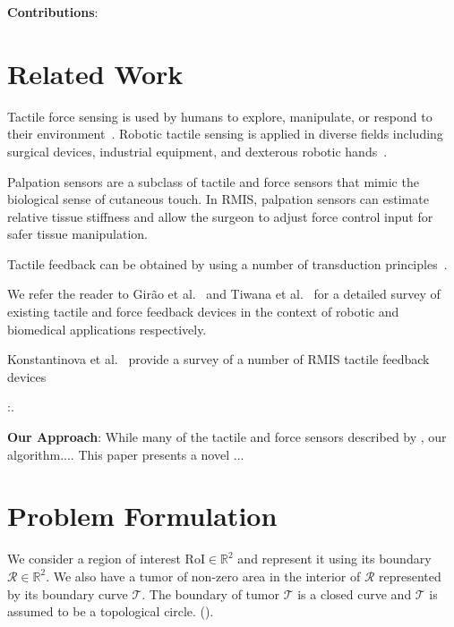 \documentclass[letterpaper, 10 pt, conference]{ieeeconf}
\begin{document}
\cite{nichols2015methods}

\textbf{Contributions}:



\section{Related Work}
\label{sec:relWork}
Tactile force sensing is used by humans to explore, manipulate, or respond to their environment~\cite{cutkosky2008force}.
Robotic tactile sensing is applied in diverse fields including surgical devices, industrial equipment, and dexterous robotic hands~\cite{cutkosky2008force}.

Palpation sensors are a subclass of tactile and force sensors that mimic the biological sense of cutaneous touch. In RMIS, palpation sensors can estimate relative tissue stiffness and allow the surgeon to adjust force control input for safer tissue manipulation.

Tactile feedback can be obtained by using a number of transduction principles~\cite{konstantinova2014implementation, puangmali2008state}. We refer the reader to Gir{\~a}o et al.~\cite{girao2013tactile} and Tiwana et al.~\cite{tiwana2012review} for a detailed survey of existing tactile and force feedback devices in the context of robotic and biomedical applications respectively. 

Konstantinova et al.~\cite{konstantinova2014implementation} provide a survey of a number of RMIS tactile feedback devices 

:\cite{goldman2013algorithms}.


\textbf{Our Approach}: While many of the tactile and force sensors described by \citep{goldman2013algorithms}, our algorithm....
This paper presents a novel ...


\section{Problem Formulation}
\label{sec:problem}
We consider a region of interest $\text{RoI} \in \mathbb{R}^2$ and represent it using its boundary $\mathcal{R} \in \mathbb{R}^2$. We also have a tumor of non-zero area in the interior of $\mathcal{R}$ represented by its boundary curve $\mathcal{T}$. The boundary of tumor $\mathcal{T}$ is a closed curve and $\mathcal{T}$ is assumed to be a topological circle. (). 
\end{document}
